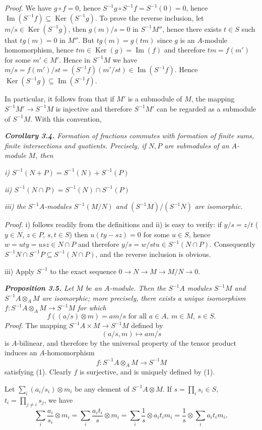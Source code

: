 \noindent\emph{Proof.}  We have $g\circ f=0$, hence $S^{-1}g\circ S^{-1}f=S^{-1}(0)=0$, hence $\operatorname{Im}(S^{-1}f)
\subseteq\operatorname{Ker}(S^{-1}g)$.  To prove the reverse inclusion, let $m/s\in\operatorname{Ker}(S^{-1}g)$, then
$g(m)/s=0$ in $S^{-1}M''$, hence there exists $t\in S$ such that $tg(m)=0$ in $M''$.  But
$tg(m)=g(tm)$ since $g$ is an $A$-module homomorphism, hence $tm\in\operatorname{Ker}(g)=
\operatorname{Im}(f)$ and therefore $tm=f(m')$ for some $m'\in M'$.  Hence in $S^{-1}M$ we have
$m/s=f(m')/st=(S^{-1}f)(m'/st)\in\operatorname{Im}(S^{-1}f)$.  Hence $\operatorname{Ker}(S^{-1}g)\subseteq\operatorname{Im}(S^{-1}f)$.\proofbox

In particular, it follows from  that if $M'$ is a submodule of $M$, the mapping $S^{-1}M'\longrightarrow S^{-1}M$ is injective and therefore $S^{-1}M'$ can be regarded as a
submodule of $S^{-1}M$.  With this convention,

\medskip
\noindent\textit{\textbf{Corollary 3.4.} Formation of fractions commutes with formation of finite
sums, finite intersections and quotients.  Precisely, if $N,P$ are submodules
of an $A$-module $M$, then}

\noindent\textit{i) $S^{-1}(N+P)=S^{-1}(N)+S^{-1}(P)$}

\noindent\textit{ii) $S^{-1}(N\cap P)=S^{-1}(N)\cap S^{-1}(P)$}

\noindent\textit{iii) the $S^{-1}A$-modules $S^{-1}(M/N)$ and $(S^{-1}M)/(S^{-1}N)$ are isomorphic.}

\noindent\emph{Proof.}  i) follows readily from the definitions and ii) is easy to veri{}fy:
if $y/s=z/t$ ($y\in N$, $z\in P$, $s,t\in S$) then $u(ty-sz)=0$ for some $u\in S$, hence
$w=uty=usz\in N\cap P$ and therefore $y/s=w/stu\in S^{-1}(N\cap P)$.  Consequently
$S^{-1}N\cap S^{-1}P\subseteq S^{-1}(N\cap P)$, and the reverse inclusion is obvious.

iii) Apply $S^{-1}$ to the exact sequence $0\longrightarrow N\longrightarrow M\longrightarrow M/N\longrightarrow0$.\proofbox

\medskip
\noindent\textit{\textbf{Proposition 3.5.} Let $M$ be an $A$-module.  Then the $S^{-1}A$ modules $S^{-1}M$ and
$S^{-1}A\otimes_A M$ are isomorphic; more precisely, there exists a unique isomorphism $f:S^{-1}A\otimes_A M\longrightarrow S^{-1}M$ for which}
\begin{equation}
f((a/s)\otimes m)=am/s\text{ for all }a\in A,\ m\in M,\ s\in S.
\tag{1}
\end{equation}
\noindent\emph{Proof.}  The mapping $S^{-1}A\times M\longrightarrow S^{-1}M$ defined by
\[
(a/s,m)\longmapsto am/s
\]
is $A$-bilinear, and therefore by the universal property  of the tensor product
induces an $A$-homomorphism
\[
f:S^{-1}A\otimes_A M\longrightarrow S^{-1}M
\]
satisfying (1).  Clearly $f$ is surjective, and is uniquely defined by (1).

Let $\sum_i(a_i/s_i)\otimes m_i$ be any element of $S^{-1}A\otimes M$.  If $s=\prod_i s_i\in S$,
$t_i=\prod_{j\ne i}s_j$, we have
\[
\sum_i\frac{a_i}{s_i}\otimes m_i
=\sum_i\frac{a_it_i}{s}\otimes m_i
=\sum_i\frac1s\otimes a_it_im_i
=\frac1s\otimes\sum_i a_it_im_i,
\]
